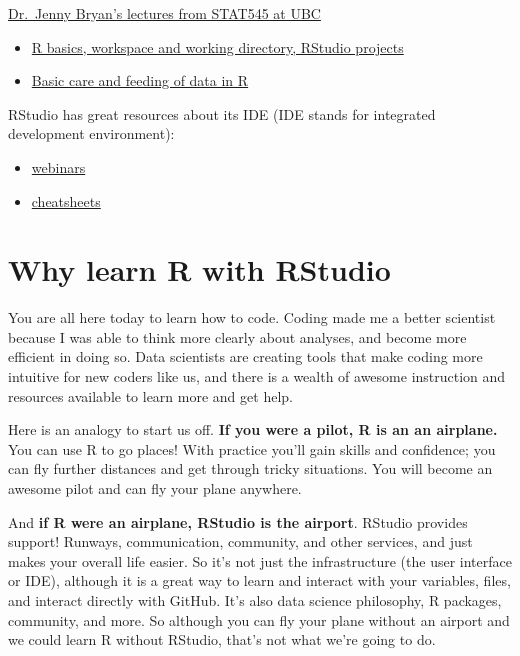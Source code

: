 \documentclass[]{book}
\providecommand{\tightlist}{%
  \setlength{\itemsep}{0pt}\setlength{\parskip}{0pt}}
\theoremstyle{definition}
\theoremstyle{definition}
\theoremstyle{definition}
\theoremstyle{remark}
\begin{document}
\href{https://stat545-ubc.github.io/}{Dr.~Jenny Bryan's lectures from
STAT545 at UBC}

\begin{itemize}
\tightlist
\item
  \href{http://stat545-ubc.github.io/block002_hello-r-workspace-wd-project.html}{R
  basics, workspace and working directory, RStudio projects}
\item
  \href{http://stat545-ubc.github.io/block006_care-feeding-data.html}{Basic
  care and feeding of data in R}
\end{itemize}

RStudio has great resources about its IDE (IDE stands for integrated
development environment):

\begin{itemize}
\tightlist
\item
  \href{https://www.rstudio.com/resources/webinars/}{webinars}
\item
  \href{https://www.rstudio.com/resources/cheatsheets/}{cheatsheets}
\end{itemize}

\section{Why learn R with RStudio}\label{why-learn-r-with-rstudio}

You are all here today to learn how to code. Coding made me a better
scientist because I was able to think more clearly about analyses, and
become more efficient in doing so. Data scientists are creating tools
that make coding more intuitive for new coders like us, and there is a
wealth of awesome instruction and resources available to learn more and
get help.

Here is an analogy to start us off. \textbf{If you were a pilot, R is an
an airplane.} You can use R to go places! With practice you'll gain
skills and confidence; you can fly further distances and get through
tricky situations. You will become an awesome pilot and can fly your
plane anywhere.

And \textbf{if R were an airplane, RStudio is the airport}. RStudio
provides support! Runways, communication, community, and other services,
and just makes your overall life easier. So it's not just the
infrastructure (the user interface or IDE), although it is a great way
to learn and interact with your variables, files, and interact directly
with GitHub. It's also data science philosophy, R packages, community,
and more. So although you can fly your plane without an airport and we
could learn R without RStudio, that's not what we're going to do.
\end{document}
